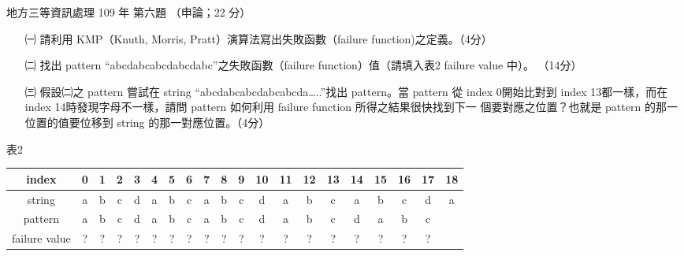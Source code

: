 \begin{pastexam}[label={px:df3-109-ds-06}]{地方三等資訊處理 109 年 第六題}
（申論；22 分）

\begin{itemize}[leftmargin=2.2em]
\item[㈠] 請利用 KMP（Knuth, Morris, Pratt）演算法寫出失敗函數（failure function)之定義。（4分）
\item[㈡] 找出 pattern “abcdabcabcdabcdabc”之失敗函數（failure function）值（請填入表2 failure value 中）。
（14分）
\item[㈢] 假設㈡之 pattern 嘗試在 string “abcdabcabcdabcabcda…..”找出 pattern。當 pattern 從 index 0開始比對到
index 13都一樣，而在 index 14時發現字母不一樣，請問 pattern 如何利用 failure function 所得之結果很快找到下一
個要對應之位置？也就是 pattern 的那一位置的值要位移到 string 的那一對應位置。（4分）
\end{itemize}
\begin{center}
表2\\[2pt]
\small
\setlength{\tabcolsep}{3pt}
\begin{tabular}{|c|*{19}{c|}}
\hline
index & 0 & 1 & 2 & 3 & 4 & 5 & 6 & 7 & 8 & 9 & 10 & 11 & 12 & 13 & 14 & 15 & 16 & 17 & 18 \\ \hline
string & a & b & c & d & a & b & c & a & b & c & d & a & b & c & a & b & c & d & a \\ \hline
pattern & a & b & c & d & a & b & c & a & b & c & d & a & b & c & d & a & b & c & \\ \hline
failure value & ? & ? & ? & ? & ? & ? & ? & ? & ? & ? & ? & ? & ? & ? & ? & ? & ? & ? & \\ \hline
\end{tabular}
\end{center}
\end{pastexam}

